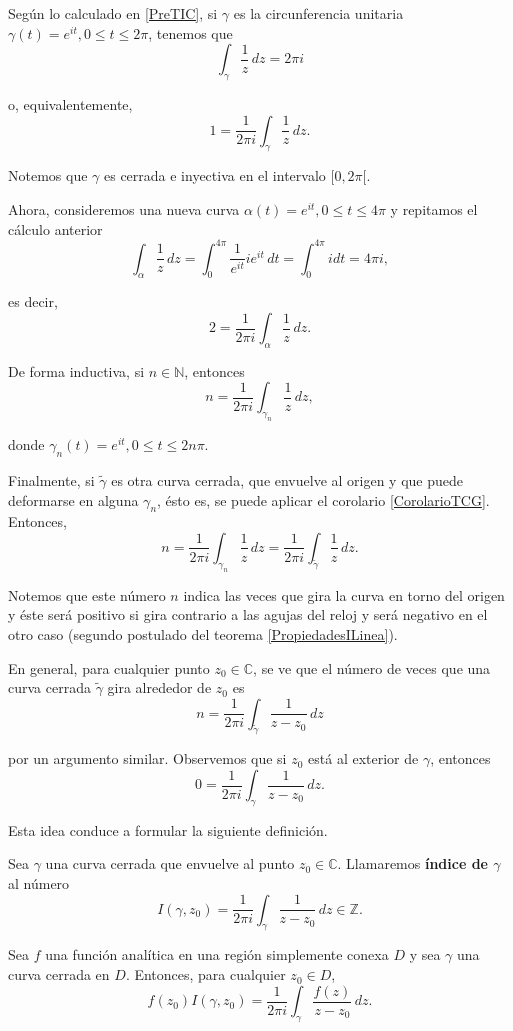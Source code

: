 Según lo calculado en \eqref{PreTIC},
si $\gamma$ es la circunferencia unitaria $\gamma(t) = e^{it}, 0 \leq t \leq 2\pi$, tenemos que
$$\int_{\gamma} \frac{1}{z} \,dz = 2\pi i$$

o, equivalentemente,
$$1 = \frac{1}{2\pi i} \int_{\gamma} \frac{1}{z} \,dz. $$

Notemos que $\gamma$ es cerrada e inyectiva en el intervalo $[0,2\pi[$. 

Ahora, consideremos una nueva curva $\alpha(t) = e^{it}, 0\leq t \leq 4\pi$ y repitamos el cálculo anterior
$$\int_{\alpha} \frac{1}{z} \,dz = \int_0^{4\pi} \frac{1}{e^{it}} i e^{it} \,dt = \int_0^{4\pi} i dt = 4\pi i,$$

es decir,
$$2 = \frac{1}{2\pi i} \int_{\alpha} \frac{1}{z} \,dz.$$

De forma inductiva, si $n \in \mathbb{N}$, entonces
$$n = \frac{1}{2\pi i} \int_{\gamma_n} \frac{1}{z} \,dz,$$

donde $\gamma_n(t) = e^{it}, 0 \leq t \leq 2n\pi.$

Finalmente, si $\tilde{\gamma}$ es otra curva cerrada, que envuelve al origen y que puede deformarse en alguna $\gamma_n$, ésto es, se puede aplicar el corolario \ref{CorolarioTCG}. Entonces,
$$n = \frac{1}{2\pi i} \int_{\gamma_n} \frac{1}{z} \,dz =  \frac{1}{2\pi i} \int_{\tilde{\gamma}} \frac{1}{z} \,dz.$$

Notemos que este número $n$ indica las veces que gira la curva en torno del origen y éste será positivo si gira contrario a las agujas del reloj y será negativo en el otro caso (segundo postulado del teorema \eqref{PropiedadesILinea}).

En general, para cualquier punto $z_0 \in \mathbb{C}$, se ve que el número de veces que una curva cerrada $\tilde{\gamma}$ gira alrededor de $z_0$ es
$$n = \frac{1}{2\pi i} \int_{\tilde{\gamma}}\frac{1}{z-z_0} \,dz$$

por un argumento similar. Observemos que si $z_0$ está al exterior de $\gamma$, entonces
$$0 = \frac{1}{2\pi i} \int_{\gamma} \frac{1}{z-z_0} \,dz.$$

Esta idea conduce a formular la siguiente definición.

\begin{defi}
Sea $\gamma$ una curva cerrada que envuelve al punto $z_0 \in \mathbb{C}$. Llamaremos \textbf{índice de $\gamma$} al número
$$I(\gamma,z_0) = \frac{1}{2\pi i} \int_{\gamma} \frac{1}{z-z_0} \,dz \in \mathbb{Z}.$$
\end{defi}

\begin{teorema} \label{FIC}
Sea $f$ una función analítica en una región simplemente conexa $D$ y sea $\gamma$ una curva cerrada en $D$. Entonces, para cualquier $z_0 \in D$,
$$f(z_0) I(\gamma,z_0) = \frac{1}{2\pi i} \int_{\gamma} \frac{f(z)}{z-z_0} \,dz.$$
\end{teorema}

